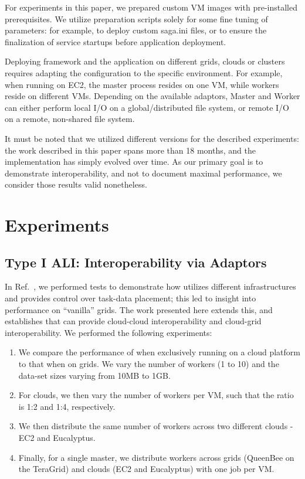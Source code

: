 \documentclass[3p,twocolumn]{elsarticle}
\begin{document}
For experiments in this paper, we prepared custom VM images with
pre-installed prerequisites.  We utilize preparation scripts solely
for some fine tuning of parameters: for example, to deploy custom
saga.ini files, or to ensure the finalization of service startups
before application deployment.

Deploying \sagamapreduce framework and the \wc application on
different grids, clouds or clusters requires adapting the configuration
to the specific environment.  For example, when running \sagamapreduce
on EC2, the master process resides on one VM, while workers reside on
different VMs.  Depending on the available adaptors, Master and Worker
can either perform local I/O on a global/distributed file system, or
remote I/O on a remote, non-shared file system.

It must be noted that we utilized different \smr versions for the
described experiments: the work described in this paper spans more
than 18 months, and the \smr implementation has simply evolved over
time.  As our primary goal is to demonstrate interoperability, and not
to document maximal performance, we consider those results valid
nonetheless.


\section{Experiments}
\label{sec:exp}

\subsection{Type I ALI: Interoperability via Adaptors}

In Ref.~\cite{saga_ccgrid09}, we performed tests to demonstrate how
\sagamapreduce utilizes different infrastructures and provides control
over task-data placement; this led to insight into performance on
``vanilla'' grids.  The work presented here extends this, and
establishes that \sagamapreduce can provide cloud-cloud
interoperability and cloud-grid interoperability.  We performed the
following experiments:

\begin{enumerate}

 \item We compare the performance of \sagamapreduce when exclusively
 running on a cloud platform to that when on grids. We vary the number
 of workers (1 to 10) and the data-set sizes varying from 10MB to 1GB.

 \item For clouds, we then vary the number of workers per VM, such
 that the ratio is 1:2 and 1:4, respectively.

 \item We then distribute the same number of workers across two
 different clouds - EC2 and Eucalyptus.

 \item Finally, for a single master, we distribute workers across
 grids (QueenBee on the TeraGrid) and clouds (EC2 and Eucalyptus) with
 one job per VM.

\end{enumerate}
\end{document}
